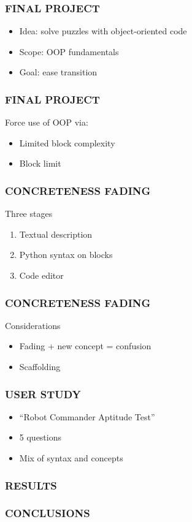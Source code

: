\documentclass{beamer}
\let\theframetitle\frametitle
\renewcommand\frametitle[1]{\theframetitle{\MakeUppercase{#1}}}
\begin{document}
\begin{frame}
\frametitle{Final Project}
\begin{itemize}[<+->]
\item Idea: solve puzzles with object-oriented code
\item Scope: OOP fundamentals
\item Goal: ease transition
\end{itemize}
\end{frame}

\begin{frame}
\frametitle{Final Project}
Force use of OOP via:
\begin{itemize}
\item Limited block complexity
\item Block limit
\end{itemize}
\end{frame}

\begin{frame}
\frametitle{Concreteness Fading}
Three stages
\begin{enumerate}
\item Textual description
\item Python syntax on blocks
\item Code editor
\end{enumerate}
\end{frame}

\begin{frame}
\frametitle{Concreteness Fading}
Considerations
\begin{itemize}
\item Fading + new concept = confusion
\item Scaffolding
\end{itemize}
\end{frame}

\begin{frame}
\frametitle{User Study}
\begin{itemize}
\item ``Robot Commander Aptitude Test''
\item 5 questions
\item Mix of syntax and concepts
\end{itemize}
\end{frame}

\begin{frame}
\frametitle{Results}
\end{frame}

\begin{frame}
\frametitle{Conclusions}
\end{frame}
\end{document}
